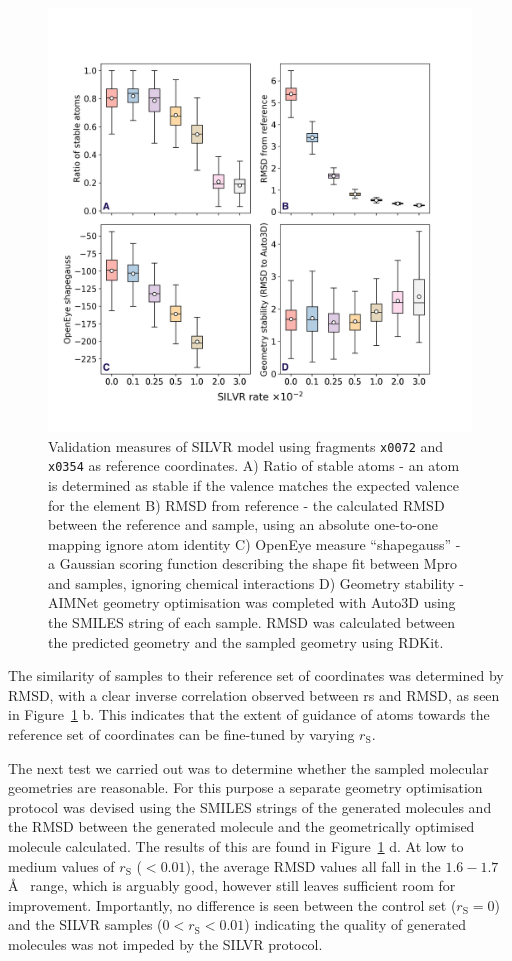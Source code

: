 \documentclass[journal=jacsat,manuscript=article]{achemso}
\begin{document}
\begin{figure}[h!]
    \centering
    \includegraphics[width=\textwidth]{paper/Figures/Fig3/fig_3_metrics.png}
    \caption{Validation measures of SILVR model using fragments \texttt{x0072} and \texttt{x0354} as reference coordinates. A) Ratio of stable atoms - an atom is determined as stable if the valence matches the expected valence for the element B) RMSD from reference - the calculated RMSD between the reference and sample, using an absolute one-to-one mapping ignore atom identity C) OpenEye measure “shapegauss” - a Gaussian scoring function describing the shape fit between Mpro and samples, ignoring chemical interactions D) Geometry stability - AIMNet geometry optimisation was completed with Auto3D using the SMILES string of each sample. RMSD was calculated between the predicted geometry and the sampled geometry using RDKit.}
    \label{fig:measures}
\end{figure}
The similarity of samples to their reference set of coordinates was determined by RMSD, with a clear inverse correlation observed between rs and RMSD, as seen in Figure~\ref{fig:measures} b. This indicates that the extent of guidance of atoms towards the reference set of coordinates can be fine-tuned by varying $r_{\mathrm{S}}$. 

The next test we carried out was to determine whether the sampled molecular geometries are reasonable. For this purpose a separate geometry optimisation protocol was devised using the SMILES strings of the generated molecules and the RMSD between the generated molecule and the geometrically optimised molecule calculated. The results of this are found in Figure~\ref{fig:measures} d. At low to medium values of $r_{\mathrm{S}}$ ($< 0.01$), the average RMSD values all fall in the $1.6 - 1.7$ \AA~  range, which is arguably good, however still leaves sufficient room for improvement. Importantly, no difference is seen between the control set ($r_{\mathrm{S}}=0$) and the SILVR samples ($0 < r_{\mathrm{S}} < 0.01$) indicating the quality of generated molecules was not impeded by the SILVR protocol. 
\end{document}
